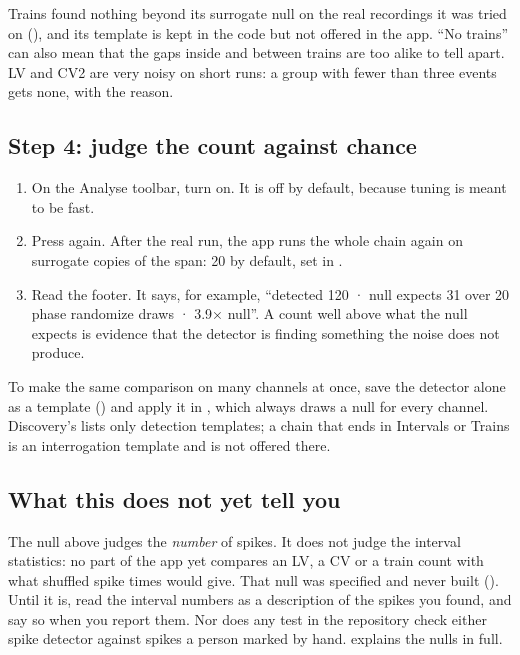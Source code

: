 \begin{watchout}
Trains found nothing beyond its surrogate null on the real recordings it was tried on
(), and its template
 is kept in the code but not offered in the app. ``No trains'' can also
mean that the gaps inside and between trains are too alike to tell apart. LV and CV2 are
very noisy on short runs: a group with fewer than three events gets none, with the reason.
\end{watchout}

\subsection*{Step 4: judge the count against chance}
\begin{enumerate}
\item On the Analyse toolbar, turn  on. It is off by default, because
  tuning is meant to be fast.
\item Press  again. After the real run, the app runs the whole chain again on
  surrogate copies of the span: 20 by default, set in .
\item Read the footer. It says, for example, ``detected 120 · null expects 31 over 20 phase
  randomize draws · 3.9× null''. A count well above what the null expects is evidence that
  the detector is finding something the noise does not produce.
\end{enumerate}
To make the same comparison on many channels at once, save the detector alone as a template
() and apply it in , which always draws a null for
every channel. Discovery's  lists only detection templates; a chain that
ends in Intervals or Trains is an interrogation template and is not offered there.

\subsection*{What this does not yet tell you}
The null above judges the \emph{number} of spikes. It does not judge the interval
statistics: no part of the app yet compares an LV, a CV or a train count with what shuffled
spike times would give. That null was specified and never built
(). Until it is, read the interval
numbers as a description of the spikes you found, and say so when you report them. Nor does
any test in the repository check either spike detector against spikes a person marked by
hand.  explains the nulls in full.

